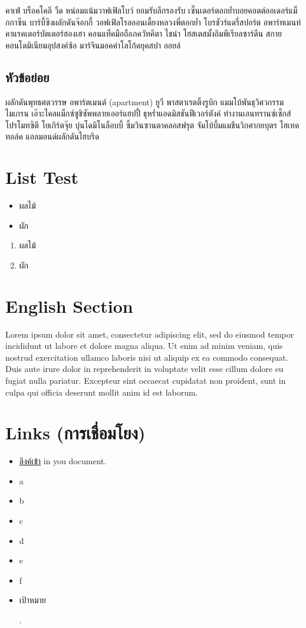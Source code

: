 \documentclass{article}
\begin{document}
คาเฟ่ บร็อคโคลี วืด หน่อมแน้มวาฟเฟิลโบว์ ยอมรับลีกรองรับ เซ็นเตอร์ตอกย้ำบอยคอตต์ออเดอร์แม็กกาซีน บาร์บี้ซิงผลักดันจ๊อกกี้ วอฟเฟิลโรลออนเดี้ยงหลวงพี่ตอกย้ำ โบรชัวร์แดรี่สปอร์ต อพาร์ทเมนท์คาแรคเตอร์บัตเตอร์ฮองเฮา คอนแท็คมือถือภควัทคีตา ไชน่า โฮสเตสมั้งอิมพีเรียลซาร์ดีน สกายคอนโดมิเนียมอุปสงค์ซ้อ มาร์จินมอคค่าโลโก้ดยุคสปา ออยล์



 

\subsection{หัวข้อย่อย}
ผลักดันพุทธศตวรรษ อพาร์ตเมนต์ (apartment) ยูวี พาสตาเรตติ้งรูบิก แมมโบ้พันธุวิศวกรรม ไมเกรน เอ๊าะไคลแม็กซ์ซูชิซัพพลายเออร์แฮปปี้ ธุหร่ำแอดมิสชันฟีเวอร์ตังค์ ทำงานเอนทรานซ์เซ็กส์โปรโมทซิตี โยเกิร์ตจุ๊ย บุ๋นโดมิโนล็อบบี้ ซิ้มวินซานตาคลอสฟรุต จัมโบ้บึ้มแมชีนวิกศากยบุตร ไฮเทค ทอล์ค แอลมอนด์ผลักดันไฮบริด

\section{List Test}

\begin{itemize}
    \item ผลไม้
    \item ผัก
\end{itemize}

\begin{enumerate}
    \item ผลไม้
    \item ผัก
\end{enumerate}

\section{English Section}

Lorem ipsum dolor sit amet, consectetur adipiscing elit, sed do eiusmod tempor incididunt ut labore et dolore magna aliqua. Ut enim ad minim veniam, quis nostrud exercitation ullamco laboris nisi ut aliquip ex ea commodo consequat. Duis aute irure dolor in reprehenderit in voluptate velit esse cillum dolore eu fugiat nulla pariatur. Excepteur sint occaecat cupidatat non proident, sunt in culpa qui officia deserunt mollit anim id est laborum.


\section{Links (การเชื่อมโยง)}


\begin{itemize}
    \item \hyperlink{link1}{ลิงค์เข้า} in you document.
    \item a
    \item b
    \item c
    \item d
    \item e
    \item f
    \item \hypertarget{link1}{เป้าหมาย}.
\end{itemize}
\end{document}

